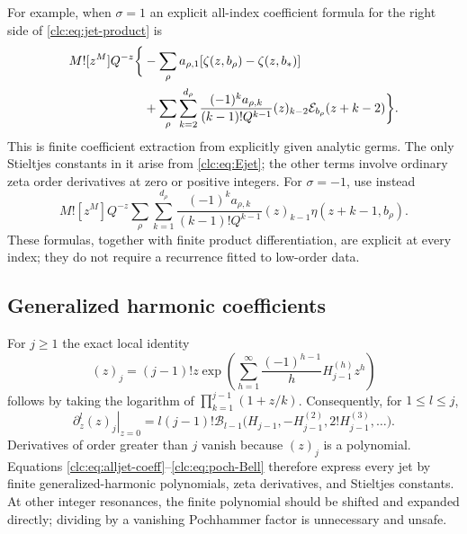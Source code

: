 For example, when $\sigma=1$ an explicit all-index coefficient formula
for the right side of \eqref{clc:eq:jet-product} is
\begin{align}
 M![z^M]Q^{-z}\biggl\{&-\sum_\rho a_{\rho,1}
         [\zeta(z,b_\rho)-\zeta(z,b_*)]\notag\\
 &+\sum_\rho\sum_{k=2}^{d_\rho}
 \frac{(-1)^ka_{\rho,k}}{(k-1)!Q^{k-1}}
      (z)_{k-2}\mathcal E_{b_\rho}(z+k-2)\biggr\}.
 \label{clc:eq:alljet-coeff}
\end{align}
This is finite coefficient extraction from explicitly given analytic
germs. The only Stieltjes constants in it arise from
\eqref{clc:eq:Ejet}; the other terms involve ordinary zeta order
derivatives at zero or positive integers. For $\sigma=-1$, use instead
\begin{equation}\label{clc:eq:alljet-eta}
 M![z^M]Q^{-z}\sum_\rho\sum_{k=1}^{d_\rho}
 \frac{(-1)^ka_{\rho,k}}{(k-1)!Q^{k-1}}
             (z)_{k-1}\eta(z+k-1,b_\rho).
\end{equation}
These formulas, together with finite product differentiation, are
explicit at every index; they do not require a recurrence fitted to
low-order data.

\subsection{Generalized harmonic coefficients}
For $j\ge1$ the exact local identity
\begin{equation}\label{clc:eq:poch-harmonic}
 (z)_j=(j-1)!z\exp\left(
       \sum_{h=1}^\infty\frac{(-1)^{h-1}}h H_{j-1}^{(h)}z^h\right)
\end{equation}
follows by taking the logarithm of
$\prod_{k=1}^{j-1}(1+z/k)$. Consequently, for $1\le l\le j$,
\begin{equation}\label{clc:eq:poch-Bell}
 \left.\partial_z^l(z)_j\right|_{z=0}
 =l(j-1)!\mathcal B_{l-1}
 \bigl(H_{j-1},-H_{j-1}^{(2)},2!H_{j-1}^{(3)},\ldots\bigr).
\end{equation}
Derivatives of order greater than $j$ vanish because $(z)_j$ is a
polynomial. Equations \eqref{clc:eq:alljet-coeff}--\eqref{clc:eq:poch-Bell}
therefore express every jet by finite generalized-harmonic polynomials,
zeta derivatives, and Stieltjes constants. At other integer resonances,
the finite polynomial should be shifted and expanded directly; dividing
by a vanishing Pochhammer factor is unnecessary and unsafe.

